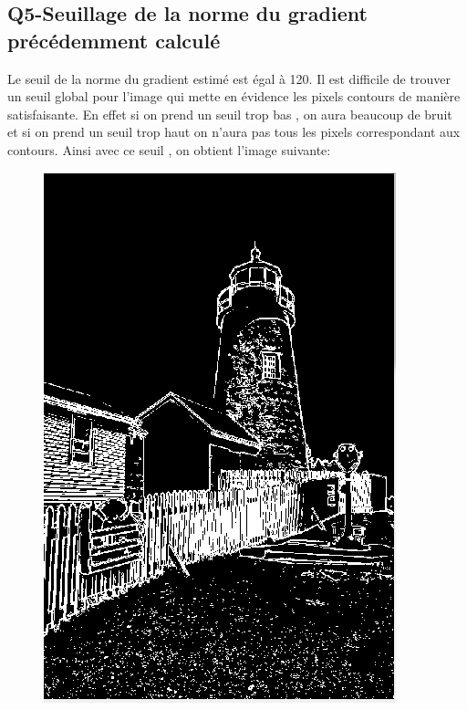 \documentclass[a4paper,12pt]{report}
\begin{document}
\subsection*{Q5-Seuillage de la norme du gradient précédemment calculé}
Le seuil de la norme du gradient estimé est égal à 120. Il est difficile de trouver un seuil global pour l'image qui mette en évidence les pixels contours de manière satisfaisante. En effet si on prend un seuil trop bas , on aura beaucoup de bruit et si on prend un seuil trop haut on n'aura pas tous les pixels correspondant aux contours. Ainsi avec ce seuil , on obtient l'image suivante:
\begin{figure}[!ht]
	\center
	\includegraphics[scale=0.4]{./imageResultats/seuillage_q5.png}
\end{figure}
\end{document}
